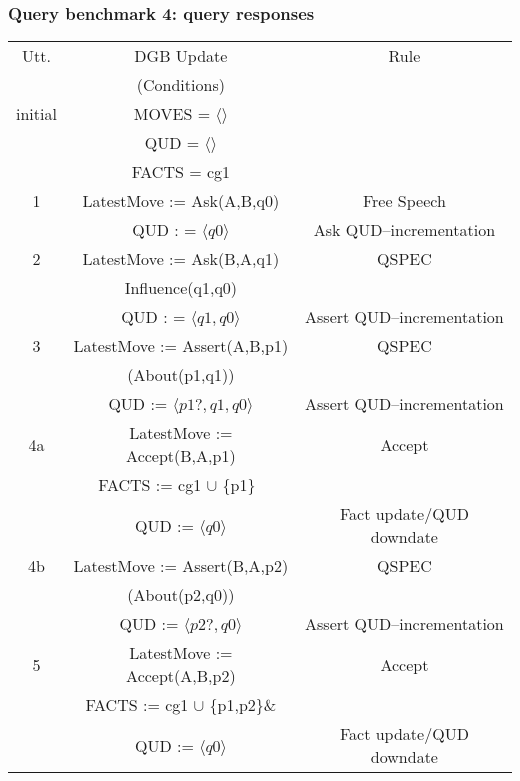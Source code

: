 \documentclass{beamer}
\begin{document}
\begin{frame}\frametitle{Query benchmark 4: query responses}

{\scriptsize \begin{tabular}{|c|c|c|}
\hline
Utt. & DGB Update  & Rule \\ \
&  (Conditions) & \\
\hline
initial & MOVES = $\langle  \rangle$ & \\
& QUD = $\langle  \rangle$ & \\
& FACTS = cg1 &\\
1 & LatestMove := Ask(A,B,q0) & {\sf Free Speech} \\
& QUD : = $\langle q0 \rangle$ & {\sf Ask  QUD--incrementation} \\
2 & LatestMove := Ask(B,A,q1) & {\sf
QSPEC} \\
& Influence(q1,q0) &\\
& QUD : = $\langle q1,q0 \rangle$ & {\sf Assert  QUD--incrementation} \\
3 & LatestMove := Assert(A,B,p1) & {\sf QSPEC} \\
& (About(p1,q1)) & \\
& QUD := $\langle p1?,q1,q0\rangle$ & {\sf Assert  QUD--incrementation} \\
4a & LatestMove := Accept(B,A,p1) & {\sf Accept} \\
& FACTS := cg1 $\cup$ \{p1\}\ & \\
& QUD := $\langle q0 \rangle$ & {\sf Fact update/QUD downdate} \\
4b & LatestMove := Assert(B,A,p2) & {\sf QSPEC} \\
& (About(p2,q0)) & \\
& QUD := $\langle p2?,q0\rangle$ & {\sf Assert  QUD--incrementation}\\
5 & LatestMove := Accept(A,B,p2) & {\sf Accept} \\
& FACTS := cg1 $\cup$ \{p1,p2\}\& \\
& QUD := $\langle q0 \rangle$ & {\sf Fact update/QUD downdate} \\
\hline
\end{tabular}
}

\end{frame}
\end{document}
